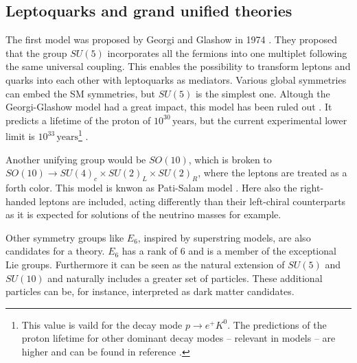 \subsection{Leptoquarks and grand unified theories}\label{GUTandLQ}
The first {\GUT} model was proposed by Georgi and Glashow in 1974 \cite{GeorgiGlashow}. They proposed that the group $SU(5)$ incorporates all the fermions into one multiplet following the same universal coupling. This enables the possibility to transform leptons and quarks into each other with leptoquarks as mediators. Various global symmetries can embed the SM symmetries, but $SU(5)$ is the simplest one. \cite{Perkins} Altough the Georgi-Glashow model had a great impact, this model has been ruled out \cite{GeorgiGlashowruledout}. It predicts a lifetime of the proton of $10^{30}\,\text{years}$, but the current experimental lower limit is $10^{33}\,\text{years}$\footnote{This value is vaild for the decay mode $p\rightarrow e^+K^0$. The predictions of the proton lifetime for other dominant decay modes -- relevant in {\GUT} models -- are higher and can be found in reference \cite{protonlifetime}.} \cite{Griffiths}\cite{protonlifetime}.\par%
Another unifying group would be $SO(10)$, which is broken to $SO(10)\rightarrow SU(4)_c\times SU(2)_L\times SU(2)_R$, where the leptons are treated as a forth color. \cite{PatiSalamExplanation} This model is knwon as Pati-Salam {\GUT} model \cite{PatiSalam}. Here also the right-handed leptons are included, acting differently than their left-chiral counterparts as it is expected for solutions of the neutrino masses for example. \cite{PatiSalamExplanation}\par
Other symmetry groups like $E_6$, inspired by superstring models, are also candidates for a {\GUT} theory. \cite{E6} $E_6$ has a rank of $6$ and is a member of the exceptional Lie groups. Furthermore it can be seen as the natural extension of $SU(5)$ and $SU(10)$ and naturally includes a greater set of particles. These additional particles can be, for instance, interpreted as dark matter candidates. \cite{E6explanation}
%
%
